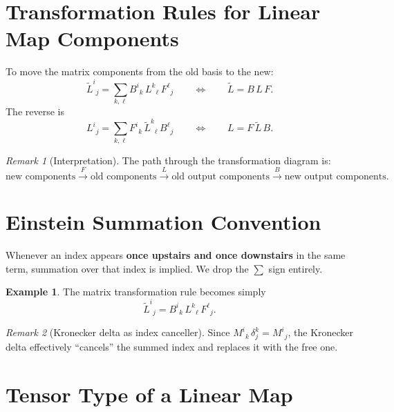 \documentclass[12pt, a4paper]{report}
\theoremstyle{definition}
\newtheorem{example}{Example}[chapter]
\theoremstyle{plain}
\theoremstyle{remark}
\newtheorem{remark}{Remark}[chapter]
\begin{document}
\section{Transformation Rules for Linear Map Components}\label{sec:lm-transform}

To move the matrix components from the old basis to the new:
\begin{equation}\label{eq:lm-fwd}
    \boxed{\tilde{L}^{i}{}_{j}
    = \sum_{k,\ell} B^{i}{}_{k}\, L^{k}{}_{\ell}\, F^{\ell}{}_{j}}
    \qquad\Longleftrightarrow\qquad
    \tilde{L} = B\,L\,F.
\end{equation}
The reverse is
\begin{equation}\label{eq:lm-bwd}
    L^{i}{}_{j}
    = \sum_{k,\ell} F^{i}{}_{k}\, \tilde{L}^{k}{}_{\ell}\, B^{\ell}{}_{j}
    \qquad\Longleftrightarrow\qquad
    L = F\,\tilde{L}\,B.
\end{equation}

\begin{remark}[Interpretation]
The path through the transformation diagram is:
\[
    \text{new components}
    \xrightarrow{F} \text{old components}
    \xrightarrow{L} \text{old output components}
    \xrightarrow{B} \text{new output components}.
\]
\end{remark}

\section{Einstein Summation Convention}\label{sec:einstein}

Whenever an index appears \textbf{once upstairs and once downstairs} in the same
term, summation over that index is implied.  We drop the $\sum$ sign entirely.

\begin{example}
The matrix transformation rule becomes simply
\[
    \tilde{L}^{i}{}_{j} = B^{i}{}_{k}\, L^{k}{}_{\ell}\, F^{\ell}{}_{j}.
\]
\end{example}

\begin{remark}[Kronecker delta as index canceller]
Since $M^{i}{}_{k}\,\delta^{k}_{j} = M^{i}{}_{j}$, the Kronecker delta effectively
``cancels'' the summed index and replaces it with the free one.
\end{remark}

\section{Tensor Type of a Linear Map}
\end{document}
